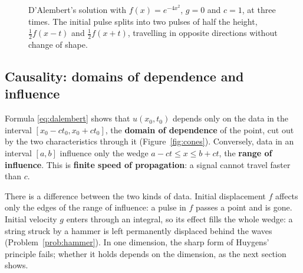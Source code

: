 \documentclass[11pt,a4paper]{article}
\numberwithin{equation}{section}
\theoremstyle{definition}
\begin{document}
\begin{figure}[H]
\caption{D'Alembert's solution with $f(x) = e^{-4x^2}$, $g = 0$ and $c = 1$, at three times. The initial pulse splits into two pulses of half the height, $\frac12f(x - t)$ and $\frac12f(x + t)$, travelling in opposite directions without change of shape.}
\label{fig:split}
\end{figure}

\subsection{Causality: domains of dependence and influence}
\label{ssec:causality}

Formula \eqref{eq:dalembert} shows that $u(x_0, t_0)$ depends only on the data in the interval $[x_0 - ct_0, x_0 + ct_0]$, the \textbf{domain of dependence} of the point, cut out by the two characteristics through it (Figure~\ref{fig:cones}). Conversely, data in an interval $[a, b]$ influence only the wedge
$a - ct \leq x \leq b + ct$, the \textbf{range of influence}. This is \textbf{finite speed of propagation}: a signal cannot travel faster than $c$.

There is a difference between the two kinds of data. Initial displacement $f$ affects only the edges of the range of influence: a pulse in $f$ passes a point and is gone. Initial velocity $g$ enters through an integral, so its effect fills the whole wedge: a string struck by a hammer
is left permanently displaced behind the waves (Problem~\ref{prob:hammer}). In one dimension, the sharp form of Huygens' principle fails; whether it holds depends on the dimension, as the next section shows.
\end{document}
